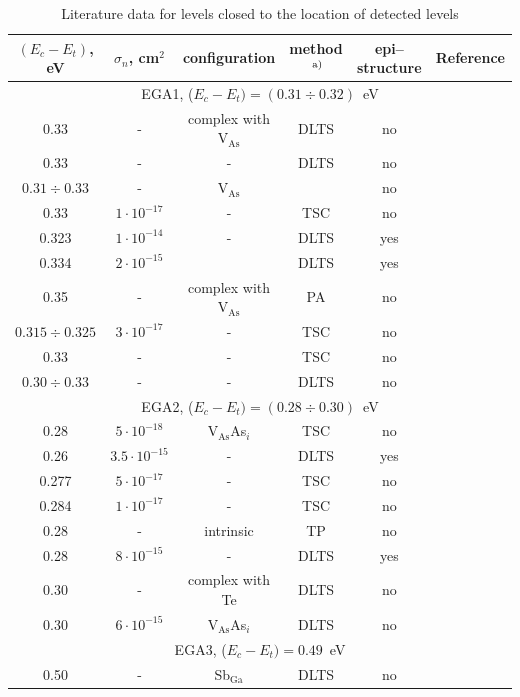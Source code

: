 \documentclass[final,3p,times,twocolumn,authoryear]{elsarticle}
\begin{document}
\begin{table}
\caption{\label{tabEGA1}Literature data for levels closed to the location of detected levels
}
\center
\begin{minipage}{1.85\textwidth}
\begin{tabular}{cccccc}
\hline
$(E_c-E_t)$, eV &$\sigma_n$, cm$^2$&configuration&method$\textsuperscript{ a)}$&epi--structure&Reference\\
\hline
\multicolumn{6}{c}{EGA1, ($E_c-E_t)=(0.31\div0.32)$~eV}\\
0.33&-&complex with V$_\mathrm{As}$&DLTS&no&\cite{EL6:Richter}\\%
0.33&-&-&DLTS&no&\cite{Neild1991}\\ %
$0.31\div0.33$&-&V$_\mathrm{As}$&&no&\cite{EL6:Schultz}\\ %
0.33&$1\cdot10^{-17}$&-&TSC&no&\cite{Pavlovic2000}\\ %
0.323&$1\cdot10^{-14}$&-&DLTS&yes&\cite{Yousefi1995}\\ %
0.334&$2\cdot10^{-15}$&&DLTS&yes&\cite{Yousefi1995}\\ %
0.35&-&complex with V$_\mathrm{As}$&PA&no&\cite{EL6:Kuisma}\\ %
$0.315\div0.325$&$3\cdot10^{-17}$&-&TSC&no&\cite{Pavlovic:GaAs}\\ %
0.33&-&-&TSC&no&\cite{Tomozane:GaAs}\\ %
$0.30\div0.33$&-&-&DLTS&no&\cite{Lang:GaAs}\\ %
\multicolumn{6}{c}{EGA2, ($E_c-E_t)=(0.28\div0.30)$~eV}\\
0.28&$5\cdot10^{-18}$&V$_\mathrm{As}$As$_i$&TSC&no&\cite{Pavlovic2000}\\ %
0.26&$3.5\cdot10^{-15}$&-&DLTS&yes&\cite{Yousefi1995}\\ %
0.277&$5\cdot10^{-17}$&-&TSC&no&\cite{Pavlovic:GaAs}\\ %
0.284&$1\cdot10^{-17}$&-&TSC&no&\cite{Pavlovic:GaAs}\\ %
0.28&-&intrinsic&TP&no&\cite{Abele:GaAs}\\ %
0.28&$8\cdot10^{-15}$&-&DLTS&yes&\cite{Mircea1975}\\ %
0.30&-&complex with Te&DLTS&no&\cite{KolFTP1994En}\\ %
0.30&$6\cdot10^{-15}$&V$_\mathrm{As}$As$_i$&DLTS&no&\cite{Pons}\\ %
\multicolumn{6}{c}{EGA3, ($E_c-E_t)=0.49$~eV}\\
0.50&-&Sb$_\mathrm{Ga}$&DLTS&no&\cite{Samoilov1994En}\\ %

\end{tabular}
\end{minipage}
\end{table}
\end{document}
